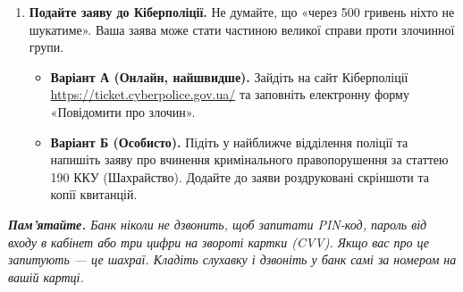 \begin{enumerate}
    \item \textbf{Подайте заяву до Кіберполіції.}
    Не думайте, що «через 500 гривень ніхто не шукатиме». Ваша заява може стати частиною великої справи проти злочинної групи.
    \begin{itemize}
        \item \textbf{Варіант А (Онлайн, найшвидше).} Зайдіть на сайт Кіберполіції \url{https://ticket.cyberpolice.gov.ua/} та заповніть електронну форму «Повідомити про злочин».
        \item \textbf{Варіант Б (Особисто).} Підіть у найближче відділення поліції та напишіть заяву про вчинення кримінального правопорушення за статтею 190 ККУ (Шахрайство). Додайте до заяви роздруковані скріншоти та копії квитанцій.
    \end{itemize}
\end{enumerate}

\vspace{0.2cm}
\textit{\textbf{Пам'ятайте.} Банк ніколи не дзвонить, щоб запитати PIN-код, пароль від входу в кабінет або три цифри на звороті картки (CVV). Якщо вас про це запитують — це шахраї. Кладіть слухавку і дзвоніть у банк самі за номером на вашій картці.}

\clearpage